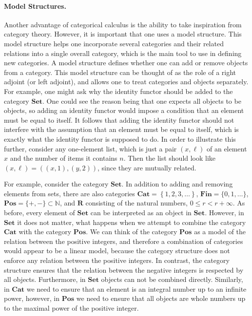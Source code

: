 \documentclass[a4paper,reqno,oneside]{article}
\begin{document}
\paragraph{Model Structures.} Another advantage of categorical calculus is the ability to take inspiration from category theory. However, it is important that one uses a model structure. This model structure helps one incorporate several categories and their related relations into a single overall category, which is the main tool to use in defining new categories. A model structure defines whether one can add or remove objects from a category. This model structure can be thought of as the role of a right adjoint (or left adjoint), and allows one to treat categories and objects separately. For example, one might ask why the identity functor should be added to the category $\mathbf{Set}$. One could see the reason being that one expects all objects to be objects, so adding an identity functor would impose a condition that an element must be equal to itself. It follows that adding the identity functor should not interfere with the assumption that an element must be equal to itself, which is exactly what the identity functor is supposed to do. In order to illustrate this further, consider any one-element list, which is just a pair $(x,\ell)$ of an element $x$ and the number of items it contains $n$. Then the list should look like $(x,\ell)=((x,1),(y,2))$, since they are mutually related. 

For example, consider the category $\mathbf{Set}$. In addition to adding and removing elements from sets, there are also categories $\mathbf{Cat}=\left\{1,2,3,\ldots\right\}$, $\mathbf{Fin}=\{0,1,\ldots\}$, $\mathbf{Pos}=\{+,-\}\subset\mathbb{N}$, and $\mathbf{R}$ consisting of the natural numbers, $0\leq r<r+\infty$. As before, every element of $\mathbf{Set}$ can be interpreted as an object in $\mathbf{Set}$. However, in $\mathbf{Set}$ it does not matter, what happens when we attempt to combine the category $\mathbf{Cat}$ with the category $\mathbf{Pos}$. We can think of the category $\mathbf{Pos}$ as a model of the relation between the positive integers, and therefore a combination of categories would appear to be a linear model, because the category structure does not enforce any relation between the positive integers. In contrast, the category structure ensures that the relation between the negative integers is respected by all objects. Furthermore, in $\mathbf{Set}$ objects can not be combined directly. Similarly, in $\mathbf{Cat}$ we need to ensure that an element is an integral number up to an infinite power, however, in $\mathbf{Pos}$ we need to ensure that all objects are whole numbers up to the maximal power of the positive integer.
\end{document}
